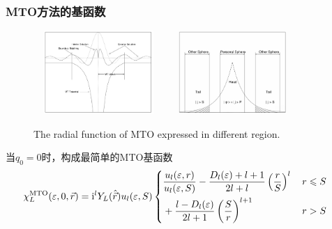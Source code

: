 \frame
{
	\frametitle{\textrm{MTO}方法的基函数}
\begin{figure}[h!]
	\vspace{-13pt}
\centering
\includegraphics[height=1.25in,width=1.95in,viewport=0 0 845 635,clip]{Figures/MTO-envelope-1.png}
\includegraphics[height=1.25in,width=1.95in,viewport=0 0 885 635,clip]{Figures/MTO-envelope-2.png}
\caption{\tiny \textrm{The radial function of MTO expressed in different region.}}%
\label{MTO-envelope}
\end{figure}
当$q_0=0$时，构成最简单的\textrm{MTO}基函数
		\begin{displaymath}
			\hspace*{-12pt}\chi_L^{\mathrm{MTO}}(\varepsilon,0,\vec r)=\mathrm{i}^lY_L(\hat{\vec r})u_l(\varepsilon,S)\left\{
			\begin{aligned}
				&\dfrac{u_l(\varepsilon,r)}{u_l(\varepsilon,S)}-\dfrac{D_l(\varepsilon)+l+1}{2l+l}\left(\dfrac rS\right)^l&\, r\leqslant S\\
				&+\dfrac{l-D_l(\varepsilon)}{2l+1}\left(\dfrac Sr\right)^{l+1}&\, r>S
			\end{aligned}\right.
		\end{displaymath}
}

